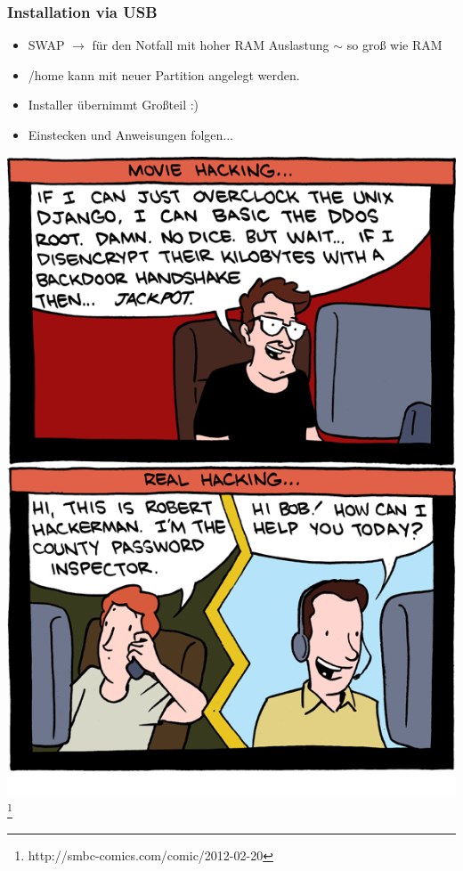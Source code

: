 \documentclass{beamer}
\begin{document}
	        \begin{frame}
          		\frametitle{Installation via USB}
        		\begin{minipage}{0.60\textwidth}
        		    \begin{itemize}
        		        \item SWAP $\to$ für den Notfall mit hoher RAM Auslastung $\sim$ so groß wie RAM
        		        \item /home kann mit neuer Partition angelegt werden.
        		        \item Installer übernimmt Großteil :)
        		        \item Einstecken und Anweisungen folgen...  
        		    \end{itemize}
        		\end{minipage}%
        		\begin{minipage}{0.39\textwidth}
        		    \includegraphics[scale=0.3]{bilder/20120220.png}\footnote{http://smbc-comics.com/comic/2012-02-20}
        		\end{minipage}
        	\end{frame}
        	
\end{document}
